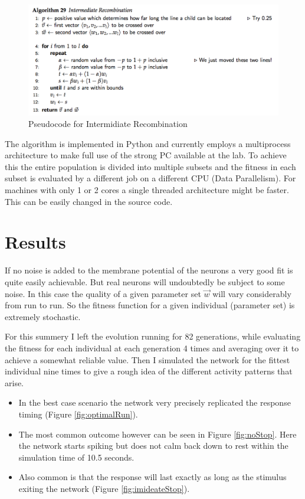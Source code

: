 \begin{figure}[H]
\includegraphics[width=\linewidth]{lineRecombination}
\caption{Pseudocode for Intermidiate Recombination \cite[p. 42]{Luke2013Metaheuristics}}
\end{figure}

The algorithm is implemented in Python and currently employs a multiprocess architecture to make full use of the strong PC available at the lab. To achieve this the entire population is divided into multiple subsets and the fitness in each subset is evaluated by a different job on a different CPU (Data Parallelism). For machines with only 1 or 2 cores a single threaded architecture might be faster. This can be easily changed in the source code.

\section{Results} %
\label{sec:results}
If no noise is added to the membrane potential of the neurons a very good fit is quite easily achievable. But real neurons will undoubtedly be subject to some noise. In this case the quality of a given parameter set $\vec{w}$ will vary considerably from run to run. So the fitness function for a given individual (parameter set) is extremely stochastic.

For this summery I left the evolution running for 82 generations, while evaluating the fitness for each individual at each generation 4 times and averaging over it to achieve a somewhat reliable value. 
Then I simulated the network for the fittest individual nine times to give a rough idea of the different activity patterns that arise. 

\begin{itemize}
	\item In the best case scenario the network very precisely replicated the response timing (Figure \ref{fig:optimalRun}). 
	\item The most common outcome however can be seen in Figure \ref{fig:noStop}. Here the network starts spiking but does not calm back down to rest within the simulation time of 10.5 seconds. 
	\item Also common is that the response will last exactly as long as the stimulus exiting the network (Figure \ref{fig:imideateStop}).
\end{itemize}


